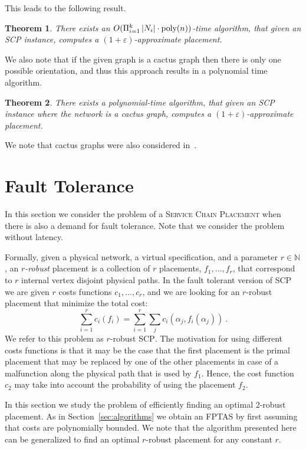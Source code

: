 \documentclass[11pt]{article}
\newtheorem{theorem}{Theorem}
\newcommand{\abs}[1]{\left| #1 \right|}
\newcommand{\naturals}{\mathbb{N}}
\newcommand{\eps}{\varepsilon}
\newcommand{\scp}{\textsc{SCP}\xspace}
\begin{document}
This leads to the following result.

\begin{theorem}
There exists an $O(\Pi_{i = 1}^k \abs{N_i} \cdot \text{\rm
  poly}(n))$-time algorithm, that given an \scp instance, computes a
$(1+\eps)$-approximate placement.
\end{theorem}

We also note that if the given graph is a cactus graph then there is
only one possible orientation, and thus this approach results in a
polynomial time algorithm.

\begin{theorem}
There exists a polynomial-time algorithm, that given an \scp instance
where the network is a cactus graph, computes a $(1+\eps)$-approximate
placement.
\end{theorem}

We note that cactus graphs were also considered in~\cite{FPS17}.


\section{Fault Tolerance}

In this section we consider the problem of a \textsc{Service Chain
  Placement} when there is also a demand for fault tolerance.  Note
that we consider the problem without latency.

Formally, given a physical network, a virtual specification, and a
parameter $r \in \naturals$, an \emph{$r$-robust} placement is a
collection of $r$ placements, $f_1,\ldots,f_r$, that correspond to $r$
internal vertex disjoint physical paths.  In the fault tolerant
version of \scp we are given $r$ costs functions $c_1,\ldots,c_r$, and
we are looking for an $r$-robust placement that minimize the total
cost:
\[
\sum_{i=1}^r c_i(f_i) = \sum_{i = 1}^r \sum_j c_i(\alpha_j,f_i(\alpha_j))
~.
\]
We refer to this problem as $r$-robust \scp.
%
The motivation for using different costs functions is that it may be
the case that the first placement is the primal placement that may be
replaced by one of the other placements in case of a malfunction along
the physical path that is used by $f_1$.  Hence, the cost function
$c_2$ may take into account the probability of using the placement
$f_2$.

In this section we study the problem of efficiently finding an optimal
2-robust placement.  As in Section~\ref{sec:algorithms} we obtain an
FPTAS by first assuming that costs are polynomially bounded.  We note
that the algorithm presented here can be generalized to find an
optimal $r$-robust placement for any constant $r$.
\end{document}
